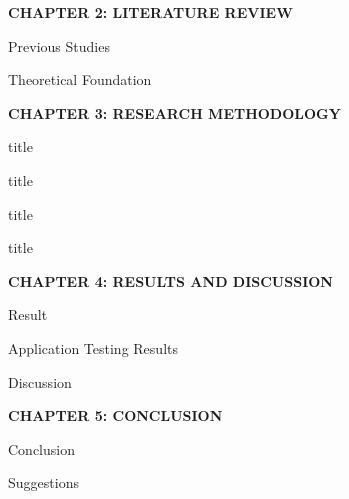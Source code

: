 	\vspace{1em}

	\noindent 
	\textbf{CHAPTER 2: LITERATURE REVIEW}
	\begin{sysenumerate}
		\setcounter{sysenumeratei}{2}
		\item[] 
		\begin{sysenumerate}
			\item Previous Studies          
			\item Theoretical Foundation    
		\end{sysenumerate}
	\end{sysenumerate}
	
	\vspace{1em}
	
	\noindent 
	\textbf{CHAPTER 3: RESEARCH METHODOLOGY}
	\begin{sysenumerate}
		\setcounter{sysenumeratei}{3} 
		\item[] 
		\begin{sysenumerate}
			\item title
			\item title
			\item title
			\item title
		\end{sysenumerate}
	\end{sysenumerate}
	
	\vspace{1em}
	
	\noindent 
	\textbf{CHAPTER 4: RESULTS AND DISCUSSION}
	\begin{sysenumerate}
		\setcounter{sysenumeratei}{4}
		\item[] 
		\begin{sysenumerate}
			\item Result
			\item Application Testing Results
			\item Discussion
		\end{sysenumerate}
	\end{sysenumerate}
		
	\vspace{1em}
		
	\noindent 
	\textbf{CHAPTER 5: CONCLUSION}
	\begin{sysenumerate}
	\setcounter{sysenumeratei}{5}
	\item[] 
		\begin{sysenumerate}
			\item Conclusion
			\item Suggestions
		\end{sysenumerate}
	\end{sysenumerate}